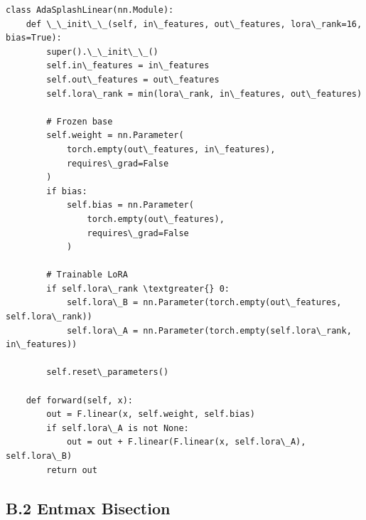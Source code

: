 \begin{lstlisting}
class AdaSplashLinear(nn.Module):
    def \_\_init\_\_(self, in\_features, out\_features, lora\_rank=16, bias=True):
        super().\_\_init\_\_()
        self.in\_features = in\_features
        self.out\_features = out\_features
        self.lora\_rank = min(lora\_rank, in\_features, out\_features)
        
        # Frozen base
        self.weight = nn.Parameter(
            torch.empty(out\_features, in\_features),
            requires\_grad=False
        )
        if bias:
            self.bias = nn.Parameter(
                torch.empty(out\_features),
                requires\_grad=False
            )
        
        # Trainable LoRA
        if self.lora\_rank \textgreater{} 0:
            self.lora\_B = nn.Parameter(torch.empty(out\_features, self.lora\_rank))
            self.lora\_A = nn.Parameter(torch.empty(self.lora\_rank, in\_features))
        
        self.reset\_parameters()
    
    def forward(self, x):
        out = F.linear(x, self.weight, self.bias)
        if self.lora\_A is not None:
            out = out + F.linear(F.linear(x, self.lora\_A), self.lora\_B)
        return out
\end{lstlisting}

\subsection{B.2 Entmax Bisection}

